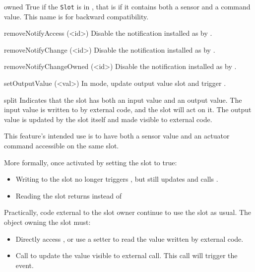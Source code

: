\begin{urbiscriptapi}
\item[owned]%
  True if the \lstinline|Slot| is in , that is if it
  contains both a sensor and a command value. This name is for backward
  compatibility.


\item[removeNotifyAccess](<id>)%
  Disable the notification installed as  by .


\item[removeNotifyChange](<id>)%
  Disable the notification installed as  by .


\item[removeNotifyChangeOwned](<id>)%
  Disable the notification installed as  by
  .

\item[setOutputValue](<val>)%
  In  mode, update output value slot  and
  trigger .

\item[split]%
  Indicates that the slot has both an input value and an output value.  The
  input value is written to by external code, and the slot will act on it.
  The output value is updated by the slot itself and made visible to
  external code.

  This feature's intended use is to have both a sensor value and an actuator
  command accessible on the same slot.

  More formally, once activated by setting the  slot to true:
\begin{itemize}
\item Writing to the slot no longer triggers , but still
  updates  and calls .
\item Reading the slot returns  instead of
\end{itemize}

Practically, code external to the slot owner continue to use the slot as
usual.  The object owning the slot must:
\begin{itemize}
\item Directly access , or use a setter to read the value
  written by external code.
\item Call  to update the value visible to external
  call.  This call will trigger the  event.
\end{itemize}


\end{urbiscriptapi}
